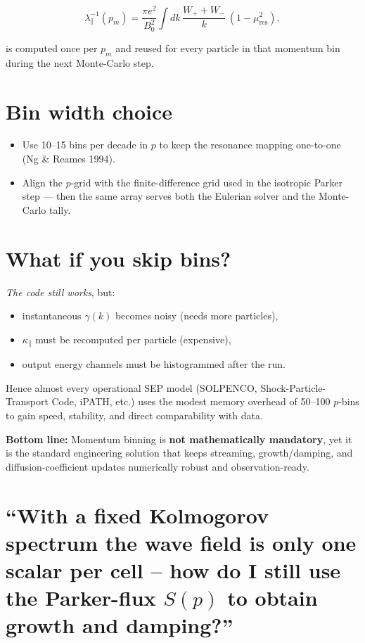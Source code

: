 \[
\lambda_\parallel^{-1}(p_m) =
\frac{\pi e^2}{B_0^2}
\int dk\, \frac{W_+ + W_-}{k} \,
\left(1 - \mu_{\text{res}}^2 \right),
\]

is computed once per $p_m$ and reused for every particle in that momentum bin during the next Monte-Carlo step.

\section*{Bin width choice}

\begin{itemize}
\item Use 10–15 bins per decade in $p$ to keep the resonance mapping one-to-one (Ng \& Reames 1994).
\item Align the $p$-grid with the finite-difference grid used in the isotropic Parker step — then the same array serves both the Eulerian solver and the Monte-Carlo tally.
\end{itemize}

\section*{What if you skip bins?}

\emph{The code still works}, but:

\begin{itemize}
\item instantaneous $\gamma(k)$ becomes noisy (needs more particles),
\item $\kappa_\parallel$ must be recomputed per particle (expensive),
\item output energy channels must be histogrammed after the run.
\end{itemize}

Hence almost every operational SEP model (SOLPENCO, Shock-Particle-Transport Code, iPATH, etc.) uses the modest memory overhead of 50–100 $p$-bins to gain speed, stability, and direct comparability with data.

\bigskip

\noindent\textbf{Bottom line:} Momentum binning is \textbf{not mathematically mandatory}, yet it is the standard engineering solution that keeps streaming, growth/damping, and diffusion-coefficient updates numerically robust and observation-ready.


\section*{“With a fixed Kolmogorov spectrum the wave field is only one scalar per cell – how do I still use the Parker-flux $S(p)$ to obtain growth and damping?”}

